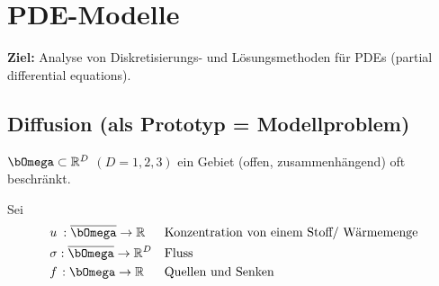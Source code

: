 \documentclass[12pt,twoside,reqno]{article}
\renewcommand{\Omega}{\bOmega}
\newcommand{\R}{\mathbb{R}}
\theoremstyle{TheoWieners}
\theoremstyle{break}
\theoremstyle{app}
\newtheorem{Spezielle Lösungen}[app]{Spezielle Lösungen}
\newtheorem{Spezielle Lösungen der Poisson-Gleichung}[app]{Spezielle Lösungen der Poisson-Gleichung}
\newtheorem{Kartesische Gitter in 2-d}[app]{Kartesische Gitter in 2-d}
\newtheorem{Diskretisierungen hoher Ordnung}[app]{Diskretisierungen hoher Ordnung}
\newtheorem{Zyklische Reduktion}[app]{Zyklische Reduktion}
\begin{document}


\section{PDE-Modelle}

\textbf{Ziel:} Analyse von Diskretisierungs- und Lösungsmethoden für PDEs (partial differential equations).
\subsection{Diffusion (als Prototyp = Modellproblem)}
$\Omega \subset \R^D$ $(D=1,2,3 )$ ein Gebiet (offen, zusammenhängend) oft beschränkt.

Sei \begin{align*}
        &u \hspace{0.08cm} : \overline\Omega \rightarrow \R     && \text{Konzentration von einem Stoff/ Wärmemenge} \\
        &\sigma: \overline\Omega \rightarrow \R^D && \text{Fluss} \\
        &f\hspace{0.04cm}: \Omega \rightarrow \R 	    && \text{Quellen und Senken}
            \end{align*}
\end{document}
